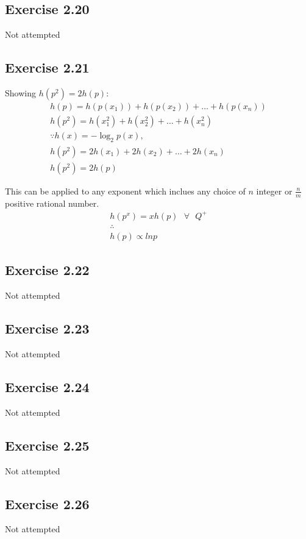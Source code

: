 \subsection{Exercise 2.20}
Not attempted

\subsection{Exercise 2.21}
Showing $h(p^2) = 2h(p)$:
\begin{gather}
  h(p) = h(p(x_1)) + h(p(x_2)) + \dots + h(p(x_n)) \\
  h(p^2) = h(x_1^2) + h(x_2^2) + \dots + h(x_n^2) \\
  \because h(x) = -\log_2 p(x), \\
  h(p^2) = 2h(x_1) + 2h(x_2) + \dots + 2h(x_n) \\
  h(p^2) = 2h(p)
\end{gather}

This can be applied to any exponent which inclues any choice of $n$ integer or $\frac{n}{m}$ positive rational number.
\begin{gather}
  h(p^x) = xh(p) \text{ }\forall\text{ } Q^+ \\
  \therefore \\
  h(p) \propto ln p
\end{gather}


\subsection{Exercise 2.22}
Not attempted

\subsection{Exercise 2.23}
Not attempted

\subsection{Exercise 2.24}
Not attempted

\subsection{Exercise 2.25}
Not attempted

\subsection{Exercise 2.26}
Not attempted

